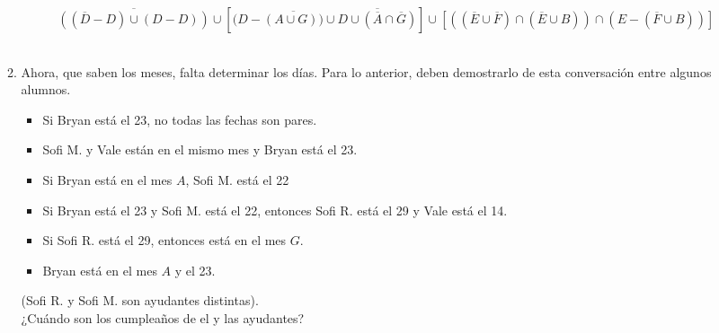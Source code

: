 \documentclass[letterpaper,10pt]{article}
\begin{document}
\begin{enumerate}
\begin{enumerate}
        \begin{equation}
            \overline{((\overline{D}-D)\cup(D-D))}\cup [(D-\overline{(A \cup G))} \cup \overline{D\cup(\overline{A}\cap \overline{G})}] \cup [((\overline{E}\cup \overline{F})\cap (\overline{E}\cup B)) \cap (E - (\overline{F}\cup B))]
        \end{equation}\\[0.3cm]
        \item Ahora, que saben los meses, falta determinar los días. Para lo anterior, deben demostrarlo de esta conversación entre algunos alumnos.
        \begin{itemize}
            \item Si Bryan está el 23, no todas las fechas son pares.
            \item Sofi M. y Vale están en el mismo mes y Bryan está el 23.
            \item Si Bryan está en el mes $A$, Sofi M. está el 22
            \item Si Bryan está el 23 y Sofi M. está el 22, entonces Sofi R. está el 29 y Vale está el 14.
            \item Si Sofi R. está el 29, entonces está en el mes $G$.
            \item Bryan está en el mes $A$ y el 23.
            
        \end{itemize}
        (Sofi R. y Sofi M. son ayudantes distintas).\\
        ¿Cuándo son los cumpleaños de el y las ayudantes?
    
    \end{enumerate}

\end{enumerate}
\end{document}
